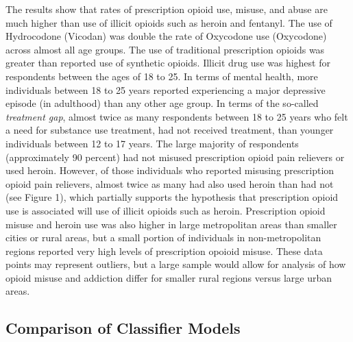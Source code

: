 \documentclass[sigconf]{acmart}
\begin{document}
The results show that rates of prescription opioid use, misuse, and abuse are
much higher than use of illicit opioids such as heroin and fentanyl. The use 
of Hydrocodone (Vicodan) was double the rate of Oxycodone use (Oxycodone) 
across almost all age groups. The use of traditional prescription opioids 
was greater than reported use of synthetic opioids. Illicit drug use was 
highest for respondents between the ages of 18 to 25. In terms of mental 
health, more individuals between 18 to 25 years reported experiencing a major 
depressive episode (in adulthood) than any other age group. In terms of the 
so-called \emph{treatment gap}, almost twice as many respondents between 
18 to 25 years who felt a need for substance use treatment, had not received
treatment, than younger individuals between 12 to 17 years. The large majority 
of respondents (approximately 90 percent) had not misused prescription opioid 
pain relievers or used heroin. However, of those individuals who reported 
misusing prescription opioid pain relievers, almost twice as many had also
used heroin than had not (see Figure 1), which partially supports the 
hypothesis that prescription opioid use is associated will use of illicit 
opioids such as heroin. Prescription opioid misuse and heroin use was also
higher in large metropolitan areas than smaller cities or rural areas, but
a small portion of individuals in non-metropolitan regions reported very
high levels of prescription opoioid misuse. These data points may represent 
outliers, but a large sample would allow for analysis of how opioid misuse 
and addiction differ for smaller rural regions versus large urban areas. 


\subsection{Comparison of Classifier Models}
\end{document}
